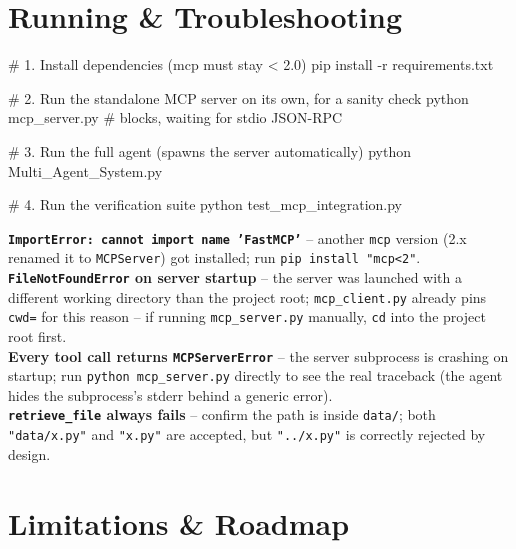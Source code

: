 \documentclass[11pt,a4paper]{article}
\begin{document}
\section{Running \& Troubleshooting}
\label{sec:running}

\begin{pycode}
# 1. Install dependencies (mcp must stay < 2.0)
pip install -r requirements.txt

# 2. Run the standalone MCP server on its own, for a sanity check
python mcp_server.py            # blocks, waiting for stdio JSON-RPC

# 3. Run the full agent (spawns the server automatically)
python Multi_Agent_System.py

# 4. Run the verification suite
python test_mcp_integration.py
\end{pycode}

\begin{tcolorbox}[
    enhanced, breakable, colback=white, colframe=navy!70!black,
    boxrule=1pt, arc=3pt, left=8pt, right=8pt, top=6pt, bottom=6pt,
    title={\small\bfseries Common Issues}, fonttitle=\bfseries,
    coltitle=white, colbacktitle=navy
]
\small
\textbf{\texttt{ImportError: cannot import name 'FastMCP'}} -- another
\texttt{mcp} version (2.x renamed it to \texttt{MCPServer}) got installed;
run \texttt{pip install "mcp<2"}.\\[4pt]
\textbf{\texttt{FileNotFoundError} on server startup} -- the server was
launched with a different working directory than the project root;
\texttt{mcp\_client.py} already pins \texttt{cwd=} for this reason -- if
running \texttt{mcp\_server.py} manually, \texttt{cd} into the project
root first.\\[4pt]
\textbf{Every tool call returns \texttt{MCPServerError}} -- the server
subprocess is crashing on startup; run \texttt{python mcp\_server.py}
directly to see the real traceback (the agent hides the subprocess's
stderr behind a generic error).\\[4pt]
\textbf{\texttt{retrieve\_file} always fails} -- confirm the path is
inside \texttt{data/}; both \texttt{"data/x.py"} and \texttt{"x.py"} are
accepted, but \texttt{"../x.py"} is correctly rejected by design.
\end{tcolorbox}

\section{Limitations \& Roadmap}
\label{sec:roadmap}
\end{document}
